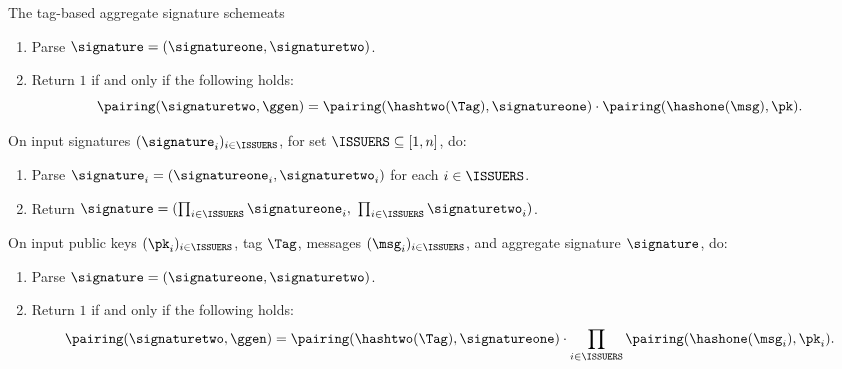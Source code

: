 \begin{protocolbox}{The tag-based aggregate signature scheme}{ats}
\begin{description}
      \begin{enumerate}

	\item Parse $\signature = (\signatureone, \signaturetwo)$.

	\item Return $1$ if and only if the following holds:
	  \begin{equation*}
	    \pairing(\signaturetwo,\ggen) = \pairing(\hashtwo(\Tag), \signatureone)
\cdot \pairing(\hashone(\msg), \pk).
	  \end{equation*}

      \end{enumerate}

    \item[$\signature \leftarrow \ATSaggregate((\signature_i)_{i \in
\ISSUERS})$:] On input signatures $(\signature_i)_{i \in \ISSUERS}$, for set
$\ISSUERS \subseteq [1, n]$, do:

      \begin{enumerate}

	\item Parse $\signature_i = (\signatureone_i, \signaturetwo_i)$ for each
$i \in \ISSUERS$.

	\item Return $\signature = (\prod_{i\in\ISSUERS} \signatureone_i, \
\prod_{i\in\ISSUERS} \signaturetwo_i)$.

      \end{enumerate}

    \item[$\{0,1\} \leftarrow \ATSverifyagg((\pk_i)_{i\in \ISSUERS},
\Tag,(\msg_i)_{i\in \ISSUERS},\signature) $ :] On input public keys
$(\pk_i)_{i\in \ISSUERS}$, tag $\Tag$, messages $(\msg_i)_{i\in \ISSUERS}$, and
aggregate signature $\signature$, do:

      \begin{enumerate}

	\item Parse $\signature = (\signatureone, \signaturetwo)$.

	\item Return $1$ if and only if the following holds:
	  \begin{equation*}
	    \pairing(\signaturetwo, \ggen) = \pairing(\hashtwo(\Tag),
\signatureone) \cdot \prod_{i\in\ISSUERS} \pairing(\hashone(\msg_i), \pk_i).
	  \end{equation*}

      \end{enumerate}

  \end{description} \end{protocolbox}

